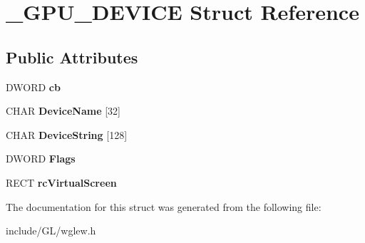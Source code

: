 \hypertarget{struct__GPU__DEVICE}{}\section{\+\_\+\+G\+P\+U\+\_\+\+D\+E\+V\+I\+CE Struct Reference}
\label{struct__GPU__DEVICE}
\subsection*{Public Attributes}
\begin{DoxyCompactItemize}
\item 
\mbox{\label{struct__GPU__DEVICE_afcb22f16ba9e526610489ff56ab78ddb}} 
D\+W\+O\+RD {\bfseries cb}
\item 
\mbox{\label{struct__GPU__DEVICE_a604bfab61f1a2c5d1e635837d369ba14}} 
C\+H\+AR {\bfseries Device\+Name} \mbox{[}32\mbox{]}
\item 
\mbox{\label{struct__GPU__DEVICE_aff8b7920ccc85afcd6f325da6cdb0b73}} 
C\+H\+AR {\bfseries Device\+String} \mbox{[}128\mbox{]}
\item 
\mbox{\label{struct__GPU__DEVICE_a008db9d0f5fc13a5160805f40465f14a}} 
D\+W\+O\+RD {\bfseries Flags}
\item 
\mbox{\label{struct__GPU__DEVICE_aeb573bbeb3b6c589246720ef259b9a27}} 
R\+E\+CT {\bfseries rc\+Virtual\+Screen}
\end{DoxyCompactItemize}


The documentation for this struct was generated from the following file\+:\begin{DoxyCompactItemize}
\item 
include/\+G\+L/wglew.\+h\end{DoxyCompactItemize}
